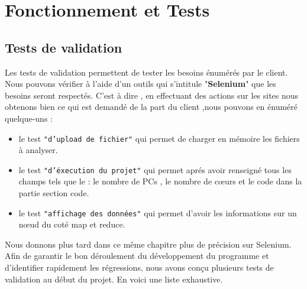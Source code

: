 \chapter{Fonctionnement et Tests}
\section{Tests de validation}

Les tests de validation permettent de tester les besoins énumérés par le client. Nous pouvons vérifier à l'aide d'un outils qui s'intitule "\textbf{Selenium}" que les besoins seront respectés. C'est à dire , en effectuant des actions sur les sites nous obtenons bien ce qui est demandé de la part du client ,nous pouvons en énuméré quelque-uns : \\

\begin{itemize}
\item le test {\tt "d'upload de fichier"} qui permet de charger en mémoire les fichiers à analyser.
\item le test {\tt "d'éxecution du projet"} qui permet aprés avoir renseigné tous les champs tels que le : le nombre de PCs , le nombre de cœurs et le code dans la partie section code.
\item le test {\tt "affichage des données"} qui permet d'avoir les informations sur un nœud du coté map et reduce.
\end{itemize}

Nous donnons plus tard dans ce même chapitre plus de précision sur Selenium.\\

Afin de garantir le bon déroulement du développement du programme et d'identifier rapidement les régressions, nous avons conçu plusieurs tests de validation au début du projet. En voici une liste exhaustive.
\vspace{0.8pt}


